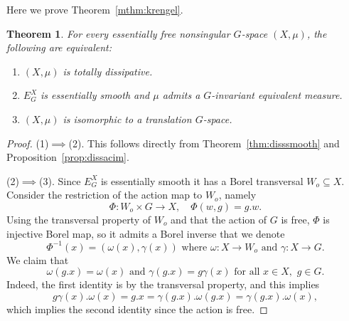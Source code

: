 \documentclass{amsart}
\numberwithin{equation}{subsection}
\newtheorem{thm}{Theorem}[section]
\begin{document}
Here we prove Theorem~\ref{mthm:krengel}.

\begin{thm}
For every essentially free nonsingular \(G\)-space \(\left(X,\mu\right)\), the following are equivalent:
\begin{enumerate}
    \item \(\left(X,\mu\right)\) is totally dissipative.
    \item \(E_{G}^{X}\) is essentially smooth and \(\mu\) admits a \(G\)-invariant equivalent measure.
    \item \(\left(X,\mu\right)\) is isomorphic to a translation \(G\)-space.
\end{enumerate}
\end{thm}

\begin{proof}
(1)\(\implies\)(2). This follows directly from Theorem~\ref{thm:disssmooth} and Proposition~\ref{prop:dissacim}.

(2)\(\implies\)(3). Since \(E_{G}^{X}\) is essentially smooth it has a Borel transversal \(W_{o}\subseteq X\). Consider the restriction of the action map to \(W_{o}\), namely
\[\Phi:W_{o}\times G\to X,\quad \Phi\left(w,g\right)=g.w.\]
Using the transversal property of \(W_{o}\) and that the action of \(G\) is free, \(\Phi\) is injective Borel map, so it admits a Borel inverse that we denote
\[\Phi^{-1}\left(x\right)=\left(\omega\left(x\right),\gamma\left(x\right)\right)\text{ where }\omega:X\to W_{o}\text{ and }\gamma:X\to G.\]
We claim that
\[\omega\left(g.x\right)=\omega\left(x\right)\text{ and }\gamma\left(g.x\right)=g\gamma\left(x\right)\text{ for all }x\in X,\,\,g\in G.\]
Indeed, the first identity is by the transversal property, and this implies
\[g\gamma\left(x\right).\omega\left(x\right)=g.x=\gamma\left(g.x\right).\omega\left(g.x\right)=\gamma\left(g.x\right).\omega\left(x\right),\]
which implies the second identity since the action is free.


\end{proof}
\end{document}
